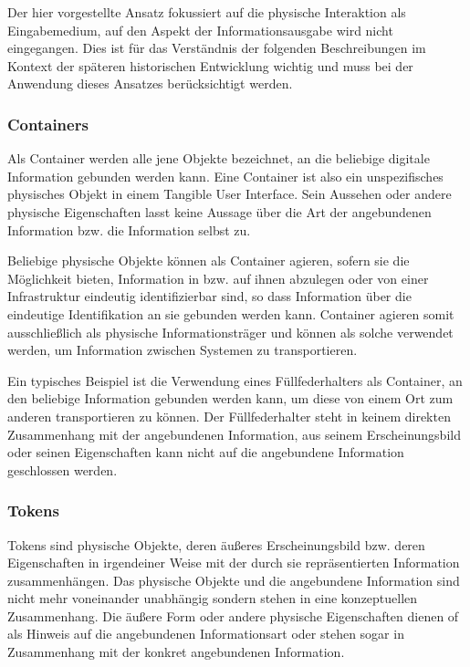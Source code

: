 Der hier vorgestellte Ansatz fokussiert auf die physische Interaktion als Eingabemedium, auf den Aspekt der Informationsausgabe wird nicht eingegangen. Dies ist für das Verständnis der folgenden Beschreibungen im Kontext der späteren historischen Entwicklung wichtig und muss bei der Anwendung dieses Ansatzes berücksichtigt werden. 

\subsubsection{Containers}

Als Container werden alle jene Objekte bezeichnet, an die beliebige digitale Information gebunden werden kann. Eine Container ist also ein unspezifisches physisches Objekt in einem Tangible User Interface. Sein Aussehen oder andere physische Eigenschaften lasst keine Aussage über die Art der angebundenen Information bzw. die Information selbst zu. 

Beliebige physische Objekte können als Container agieren, sofern sie die Möglichkeit bieten, Information in bzw. auf ihnen abzulegen oder von einer Infrastruktur eindeutig identifizierbar sind, so dass Information über die eindeutige Identifikation an sie gebunden werden kann. Container agieren somit ausschließlich als physische Informationsträger und können als solche verwendet werden, um Information zwischen Systemen zu transportieren. 

Ein typisches Beispiel ist die Verwendung eines Füllfederhalters als Container, an den beliebige Information gebunden werden kann, um diese von einem Ort zum anderen transportieren zu können. Der Füllfederhalter steht in keinem direkten Zusammenhang mit der angebundenen Information, aus seinem Erscheinungsbild oder seinen Eigenschaften kann nicht auf die angebundene Information geschlossen werden.

\subsubsection{Tokens}

Tokens sind physische Objekte, deren äußeres Erscheinungsbild bzw. deren Eigenschaften in irgendeiner Weise mit der durch sie repräsentierten Information zusammenhängen. Das physische Objekte und die angebundene Information sind nicht mehr voneinander unabhängig sondern stehen in eine konzeptuellen Zusammenhang. Die äußere Form oder andere physische Eigenschaften dienen of als Hinweis auf die angebundenen Informationsart oder stehen sogar in Zusammenhang mit der konkret angebundenen Information.


